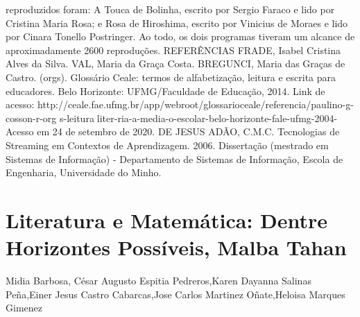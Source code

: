 reproduzidos foram: A Touca de Bolinha, escrito por Sergio Faraco e lido por Cristina Maria Rosa; 
e Rosa de Hiroshima, escrito por Vinicius de Moraes e lido por Cinara Tonello Postringer. Ao 
todo, os dois programas tiveram um alcance de aproximadamente 2600 reproduções.
REFERÊNCIAS
FRADE, Isabel Cristina Alves da Silva. VAL, Maria da Graça Costa. BREGUNCI, Maria das 
Graças de Castro. (orgs). Glossário Ceale: termos de alfabetização, leitura e escrita para 
educadores. Belo Horizonte: UFMG/Faculdade de Educação, 2014. Link de acesso: 
http://ceale.fae.ufmg.br/app/webroot/glossarioceale/referencia/paulino-g-cosson-r-org s-leituraliter-ria-a-media-o-escolar-belo-horizonte-fale-ufmg-2004- Acesso em 24 de setembro de 2020. 
DE JESUS ADÃO, C.M.C. Tecnologias de Streaming em Contextos de Aprendizagem. 2006. 
Dissertação (mestrado em Sistemas de Informação) - Departamento de Sistemas de Informação, 
Escola de Engenharia, Universidade do Minho.



\section{Literatura e Matemática: Dentre Horizontes Possíveis, Malba Tahan}

Midia Barbosa, César Augusto Espitia Pedreros,Karen Dayanna Salinas Peña,Einer Jesus Castro Cabarcas,Jose Carlos Martinez Oñate,Heloisa Marques Gimenez


